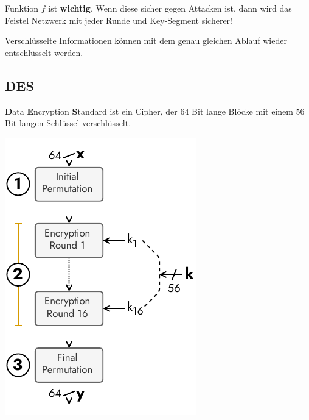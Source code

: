 \documentclass[
  10pt,
  a4paper,
  twocolumn]{article}
\begin{document}
Funktion \(f\) ist \textbf{wichtig}. Wenn diese sicher gegen Attacken
ist, dann wird das Feistel Netzwerk mit jeder Runde und Key-Segment
sicherer!

\begin{tcolorbox}[enhanced jigsaw, colframe=quarto-callout-important-color-frame, bottomrule=.15mm, colback=white, left=2mm, toprule=.15mm, arc=.35mm, coltitle=black, opacityback=0, rightrule=.15mm, title=\textcolor{quarto-callout-important-color}{\faExclamation}\hspace{0.5em}{Ver- \& Entschlüsseln}, colbacktitle=quarto-callout-important-color!10!white, opacitybacktitle=0.6, toptitle=1mm, bottomtitle=1mm, titlerule=0mm, leftrule=.75mm, breakable]

Verschlüsselte Informationen können mit dem genau gleichen Ablauf wieder
entschlüsselt werden.

\end{tcolorbox}

\subsection{\texorpdfstring{DES
\href{https://www.youtube.com/watch?v=3BZRBfhpIb0}{\color{BrickRed}\faYoutube}}{DES }}\label{des}

\textbf{D}ata \textbf{E}ncryption \textbf{S}tandard ist ein Cipher, der
64 Bit lange Blöcke mit einem 56 Bit langen Schlüssel verschlüsselt.

\begin{center}
\includegraphics{images/crypto/des.pdf}
\end{center}
\end{document}

